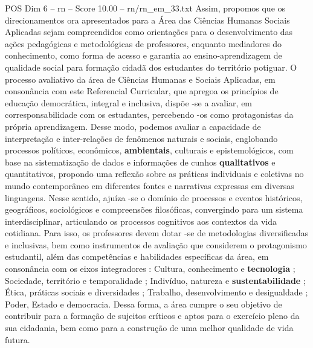 \begin{textsample}{POS Dim 6 – rn – Score 10.00 – rn/rn\_em\_33.txt}
Assim, propomos que os direcionamentos ora apresentados para a Área das Ciências Humanas Sociais Aplicadas sejam compreendidos como orientações para o desenvolvimento das ações pedagógicas e metodológicas de professores, enquanto mediadores do conhecimento, como forma de acesso e garantia ao ensino-aprendizagem de qualidade social para formação cidadã dos estudantes do território potiguar.
O processo avaliativo da área de Ciências Humanas e Sociais Aplicadas, em consonância com este Referencial Curricular, que apregoa os princípios de educação democrática, integral e inclusiva, dispõe -se a avaliar, em corresponsabilidade com os estudantes, percebendo -os como protagonistas da própria aprendizagem.
Desse modo, podemos avaliar a capacidade de interpretação e inter-relações de fenômenos naturais e sociais, englobando processos políticos, econômicos, \textbf{ambientais}, culturais e epistemológicos, com base na sistematização de dados e informações de cunhos \textbf{qualitativos} e quantitativos, propondo uma reflexão sobre as práticas individuais e coletivas no mundo contemporâneo em diferentes fontes e narrativas expressas em diversas linguagens.
Nesse sentido, ajuíza -se o domínio de processos e eventos históricos, geográficos, sociológicos e compreensões filosóficas, convergindo para um sistema interdisciplinar, articulando os processos cognitivos aos contextos da vida cotidiana.
Para isso, os professores devem dotar -se de metodologias diversificadas e inclusivas, bem como instrumentos de avaliação que considerem o protagonismo estudantil, além das competências e habilidades específicas da área, em consonância com os eixos integradores : Cultura, conhecimento e \textbf{tecnologia} ; Sociedade, território e temporalidade ; Indivíduo, natureza e \textbf{sustentabilidade} ; Ética, práticas sociais e diversidades ; Trabalho, desenvolvimento e desigualdade ; Poder, Estado e democracia.
Dessa forma, a área cumpre o seu objetivo de contribuir para a formação de sujeitos críticos e aptos para o exercício pleno da sua cidadania, bem como para a construção de uma melhor qualidade de vida futura.

\end{textsample}
